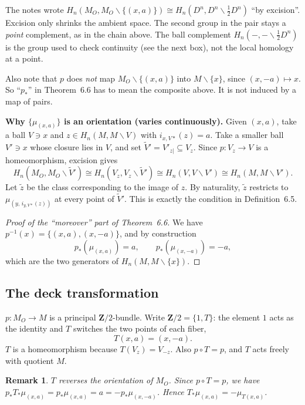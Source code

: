\documentclass[11pt]{article}
\newcommand{\Z}{\mathbf{Z}}
\newcommand{\MO}{M_O}
\newcommand{\minus}{\smallsetminus}
\newcommand{\iso}{\cong}
\theoremstyle{namedit}
\theoremstyle{namedrm}
\newtheorem{rem}{Remark}
\begin{document}
\begin{correction}[label=c:excision]
The notes wrote $H_n(\MO,\MO\minus\{(x,a)\})\iso H_n(D^n,D^n\minus\tfrac12D^n)$ ``by excision''.
Excision only shrinks the ambient space. The second group in the pair stays a \emph{point}
complement, as in the chain above. The ball complement $H_n(-,-\minus\tfrac12D^n)$ is the group used
to check continuity (see the next box), not the local homology at a point.\par\smallskip
Also note that $p$ does \emph{not} map $\MO\minus\{(x,a)\}$ into $M\minus\{x\}$, since
$(x,-a)\mapsto x$. So ``$p_*$'' in Theorem~6.6 has to mean the composite above. It is not
induced by a map of pairs.
\end{correction}

\begin{filled}
\textbf{Why $\{\mu_{(x,a)}\}$ is an orientation (varies continuously).}
Given $(x,a)$, take a ball $V\ni x$ and $z\in H_n(M,M\minus V)$ with $i_{x,V*}(z)=a$. Take a smaller
ball $V'\ni x$ whose closure lies in $V$, and set $\widetilde V'=V'_{z|}\subseteq V_z$. Since
$p\colon V_z\to V$ is a homeomorphism, excision gives
\[
  H_n(\MO,\MO\minus\widetilde V')\iso H_n(V_z,V_z\minus\widetilde V')\iso H_n(V,V\minus V')\iso H_n(M,M\minus V').
\]
Let $\tilde z$ be the class corresponding to the image of $z$. By naturality, $\tilde z$ restricts to
$\mu_{(y,\,i_{y,V*}(z))}$ at every point of $\widetilde V'$. This is exactly the condition in
Definition~6.5.
\end{filled}

\begin{proof}[Proof of the ``moreover'' part of Theorem~6.6]
We have $p^{-1}(x)=\{(x,a),(x,-a)\}$, and by construction
\[
  p_*(\mu_{(x,a)})=a,\qquad p_*(\mu_{(x,-a)})=-a,
\]
which are the two generators of $H_n(M,M\minus\{x\})$.
\end{proof}

\subsection{The deck transformation}
$p\colon\MO\to M$ is a principal $\Z/2$-bundle. Write $\Z/2=\{1,T\}$: the element $1$ acts as the
identity and $T$ switches the two points of each fiber,
\[
  T(x,a)=(x,-a).
\]
$T$ is a homeomorphism because $T(V_z)=V_{-z}$. Also $p\circ T=p$, and $T$ acts freely with quotient $M$.

\begin{rem}
$T$ \emph{reverses} the orientation of $\MO$. Since $p\circ T=p$, we have
$p_*T_*\mu_{(x,a)}=p_*\mu_{(x,a)}=a=-p_*\mu_{(x,-a)}$. Hence $T_*\mu_{(x,a)}=-\mu_{T(x,a)}$.
\end{rem}
\end{document}
